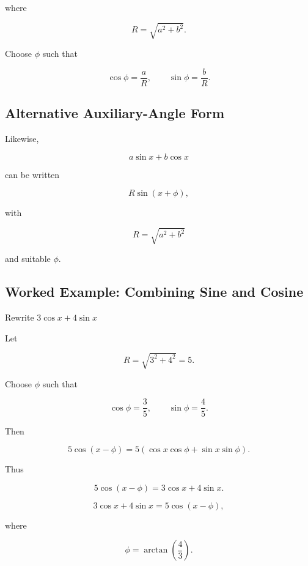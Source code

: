 where

\[
\boxed{
R
=
\sqrt{a^2+b^2}.
}
\]

Choose \(\phi\) such that

\[
\boxed{
\cos\phi
=
\frac{a}{R},
\qquad
\sin\phi
=
\frac{b}{R}.
}
\]

\subsection{Alternative Auxiliary-Angle Form}
\label{subsec:auxiliary-angle-sine-form}

Likewise,

\[
a\sin x+b\cos x
\]

can be written

\[
\boxed{
R\sin(x+\phi),
}
\]

with

\[
R=\sqrt{a^2+b^2}
\]

and suitable \(\phi\).

\subsection{Worked Example: Combining Sine and Cosine}
\label{subsec:worked-combining-sine-cosine}

\begin{workedexamplebox}{Rewrite \(3\cos x+4\sin x\)}

Let

\[
R
=
\sqrt{3^2+4^2}
=
5.
\]

Choose \(\phi\) such that

\[
\cos\phi
=
\frac35,
\qquad
\sin\phi
=
\frac45.
\]

Then

\[
5\cos(x-\phi)
=
5
\left(
\cos x\cos\phi
+
\sin x\sin\phi
\right).
\]

Thus

\[
5\cos(x-\phi)
=
3\cos x+4\sin x.
\]

\begin{answerbox}
\[
\boxed{
3\cos x+4\sin x
=
5\cos(x-\phi),
}
\]

where

\[
\boxed{
\phi
=
\arctan\left(\frac43\right).
}
\]
\end{answerbox}

\end{workedexamplebox}

